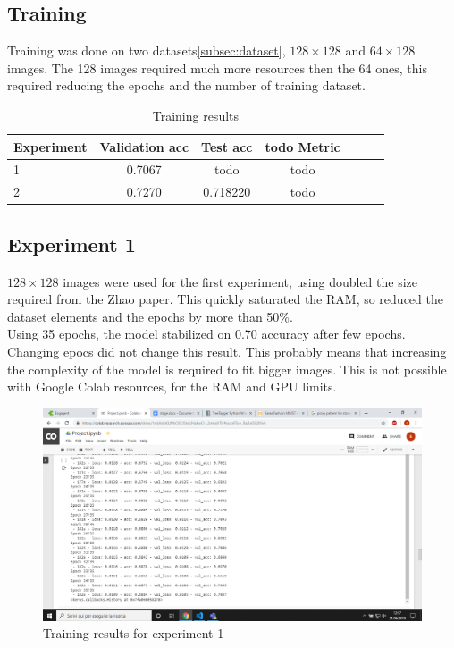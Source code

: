 \documentclass[twocolumn,showpacs,%
  nofootinbib,aps,superscriptaddress,%
  eqsecnum,prd,notitlepage,showkeys,10pt]{revtex4-1}
\begin{document}
\subsection{Training}
Training was done on two datasets\ref{subsec:dataset}, $128\times128$ and $64\times128$ images. The 128 images required much more resources then the 64 ones, this required reducing the epochs and the number of training dataset.\\
\begin{table}[H] \label{tab:training}
    \centering
    \begin{tabular}{l|c|c|c|c|c|c}
    Experiment       &  Validation acc & Test acc & todo Metric \\\hline
    1          &  0.7067           & todo      &  todo       \\\hline
    2          &  0.7270        & 0.718220      &  todo
    \end{tabular}
    \caption{\label{tab:widgets}Training results}
    \end{table}

\subsection{Experiment 1}
$128\times128$ images were used for the first experiment, using doubled the size required from the Zhao paper. This quickly saturated the RAM, so reduced the dataset elements and the epochs by more than 50\%.\\
Using 35 epochs, the model stabilized on 0.70 accuracy after few epochs. Changing epocs did not change this result. This probably means that increasing the complexity of the model is required to fit bigger images. This is not possible with Google Colab resources, for the RAM and GPU limits.\\
\begin{figure}[H]
\includegraphics[width=\textwidth]{images/128x128_35epoch_10batch_fit.png}
\caption{\label{fig:your-figure}Training results for experiment 1}
\end{figure}
\end{document}

